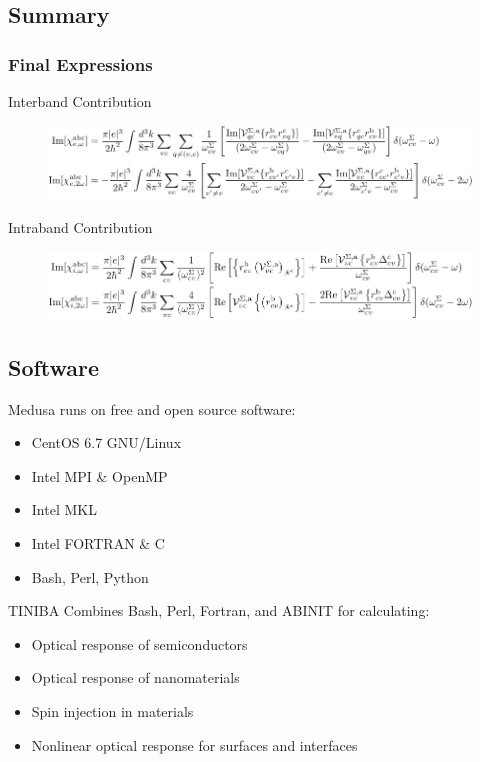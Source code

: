 \documentclass{beamer}
\begin{document}

\subsection{Summary}

\begin{frame}
\frametitle{Final Expressions}
\begin{block}{Interband Contribution}
\begin{figure}
\centering
\includegraphics[scale=0.70]{chis_inter}
\end{figure}
\end{block}
\begin{alertblock}{Intraband Contribution}
\begin{figure}
\centering
\includegraphics[scale=0.70]{chis_intra}
\end{figure}
\end{alertblock}
\end{frame}

\subsection{Software}
\begin{frame}
Medusa runs on free and open source software:
\begin{itemize}
\item CentOS 6.7 GNU/Linux
\item Intel MPI \& OpenMP
\item Intel MKL
\item Intel FORTRAN \& C
\item Bash, Perl, Python
\end{itemize}
\begin{block}{TINIBA}
Combines Bash, Perl, Fortran, and ABINIT for calculating:
\begin{itemize}
\item Optical response of semiconductors
\item Optical response of nanomaterials
\item Spin injection in materials
\item Nonlinear optical response for surfaces and interfaces
\end{itemize}
\end{block}
\end{frame}
\end{document}

